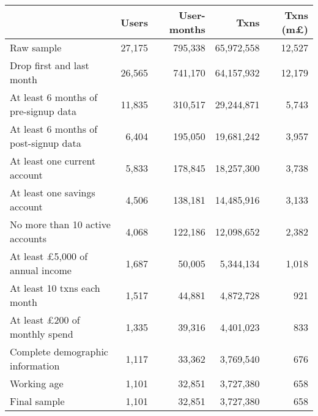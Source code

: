 \begin{tabular}{lrrrr}
\toprule
                                       &  Users & User-months &       Txns & Txns (m\pounds) \\
\midrule
                            Raw sample & 27,175 &     795,338 & 65,972,558 &          12,527 \\
             Drop first and last month & 26,565 &     741,170 & 64,157,932 &          12,179 \\
  At least 6 months of pre-signup data & 11,835 &     310,517 & 29,244,871 &           5,743 \\
 At least 6 months of post-signup data &  6,404 &     195,050 & 19,681,242 &           3,957 \\
          At least one current account &  5,833 &     178,845 & 18,257,300 &           3,738 \\
          At least one savings account &  4,506 &     138,181 & 14,485,916 &           3,133 \\
       No more than 10 active accounts &  4,068 &     122,186 & 12,098,652 &           2,382 \\
At least \pounds5,000 of annual income &  1,687 &      50,005 &  5,344,134 &           1,018 \\
           At least 10 txns each month &  1,517 &      44,881 &  4,872,728 &             921 \\
  At least \pounds200 of monthly spend &  1,335 &      39,316 &  4,401,023 &             833 \\
      Complete demographic information &  1,117 &      33,362 &  3,769,540 &             676 \\
                           Working age &  1,101 &      32,851 &  3,727,380 &             658 \\
                          Final sample &  1,101 &      32,851 &  3,727,380 &             658 \\
\bottomrule
\end{tabular}
